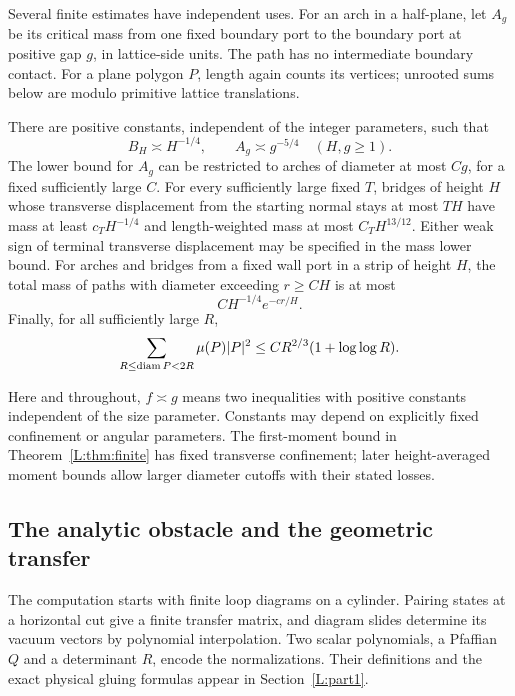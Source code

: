 Several finite estimates have independent uses. For an arch in a half-plane,
let $A_g$ be its critical mass from one fixed boundary port to the boundary
port at positive gap $g$, in lattice-side units. The path has no intermediate
boundary contact. For a plane polygon $P$, length again counts its vertices;
unrooted sums below are modulo primitive lattice translations.

\begin{theorem}\label{L:thm:finite}
There are positive constants, independent of the integer parameters, such
that
\[
 B_H\asymp H^{-1/4},\qquad A_g\asymp g^{-5/4}\quad(H,g\ge1).
\]
The lower bound for $A_g$ can be restricted to arches of diameter at most
$C g$, for a fixed sufficiently large $C$.
For every sufficiently large fixed $T$, bridges of height $H$ whose
transverse displacement from the starting normal stays at most $TH$
have mass at least $c_T H^{-1/4}$ and length-weighted mass at most
$C_T H^{13/12}$. Either weak sign of terminal transverse displacement
may be specified in the mass lower bound.
For arches and bridges from a fixed wall port in a strip of height $H$,
the total mass of paths with diameter exceeding $r\ge C H$ is at most
\[
 C H^{-1/4}e^{-c r/H}.
\]
Finally, for all sufficiently large $R$,
\[
 \sum_{R\le\operatorname{diam} P<2R}\mu(P)|P|^2
 \le C R^{2/3}(1+\log\log R).
\]
\end{theorem}

Here and throughout, $f\asymp g$ means two inequalities with positive
constants independent of the size parameter. Constants may depend on
explicitly fixed confinement or angular parameters. The first-moment
bound in Theorem~\ref{L:thm:finite} has fixed transverse confinement; later
height-averaged moment bounds allow larger diameter cutoffs with their
stated losses.

\subsection{The analytic obstacle and the geometric transfer}
The computation starts with finite loop diagrams on a cylinder. Pairing
states at a horizontal cut give a finite transfer matrix, and diagram
slides determine its vacuum vectors by polynomial interpolation. Two
scalar polynomials, a Pfaffian $Q$ and a determinant $R$, encode the
normalizations. Their definitions and the exact physical gluing formulas
appear in Section~\ref{L:part1}.


